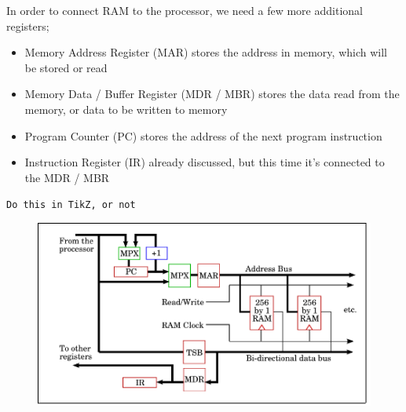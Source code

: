 \documentclass[a4paper, 12pt]{article}
\begin{document}
            \begin{center}
            \end{center}
            In order to connect RAM to the processor, we need a few more additional registers;
            \begin{itemize}
                \itemsep0em
                \item Memory Address Register (MAR)
                    \subitem stores the address in memory, which will be stored or read
                \item Memory Data / Buffer Register (MDR / MBR)
                    \subitem stores the data read from the memory, or data to be written to memory
                \item Program Counter (PC)
                    \subitem stores the address of the next program instruction
                \item Instruction Register (IR)
                    \subitem already discussed, but this time it's connected to the MDR / MBR
            \end{itemize}

            \texttt{Do this in TikZ, or not}
            \begin{figure}[h!]
                \includegraphics[width=0.5\linewidth]{2019-04-11-17-16-20.png}
            \end{figure}
\end{document}

